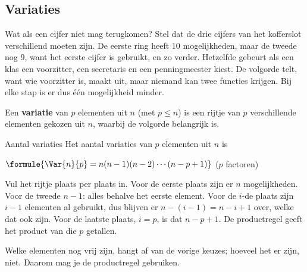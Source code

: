 \begin{oefeningen}
\end{oefeningen}

\subsection{Variaties}

Wat als een cijfer niet mag terugkomen? Stel dat de drie cijfers van het kofferslot verschillend moeten zijn. De eerste ring heeft 10 mogelijkheden, maar de tweede nog 9, want het eerste cijfer is gebruikt, en zo verder. Hetzelfde gebeurt als een klas een voorzitter, een secretaris en een penningmeester kiest. De volgorde telt, want wie voorzitter is, maakt uit, maar niemand kan twee functies krijgen. Bij elke stap is er dus één mogelijkheid minder.

\begin{theorie}
Een \textbf{\textcolor{accent}{variatie}} van $p$ elementen uit $n$ (met $p \leqslant n$) is een rijtje van $p$ verschillende elementen gekozen uit $n$, waarbij de volgorde belangrijk is.

\begin{stelling}{Aantal variaties}
Het aantal variaties van $p$ elementen uit $n$ is

\vspace{1mm}
\qquad $\formule{\Var{n}{p} = n(n - 1)(n - 2) \cdots (n - p + 1)}$ \qquad ($p$ factoren)
\end{stelling}

\begin{bewijs}
Vul het rijtje plaats per plaats in. Voor de eerste plaats zijn er $n$ mogelijkheden. Voor de tweede $n - 1$: alles behalve het eerste element. Voor de $i$-de plaats zijn $i - 1$ elementen al gebruikt, dus blijven er $n - (i - 1) = n - i + 1$ over, welke dat ook zijn. Voor de laatste plaats, $i = p$, is dat $n - p + 1$. De productregel geeft het product van die $p$ getallen.
\end{bewijs}
\end{theorie}

Welke elementen nog vrij zijn, hangt af van de vorige keuzes; hoeveel het er zijn, niet. Daarom mag je de productregel gebruiken.


